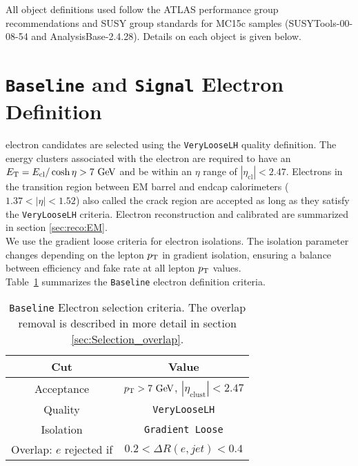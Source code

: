 \indent All object definitions used follow the ATLAS performance group recommendations and SUSY group standards for MC15c samples ({\sc SUSYTools-00-08-54} and {\sc AnalysisBase-2.4.28}).  Details on each object is given below. \\

\section{{\tt Baseline} and {\tt Signal} Electron Definition}  \label{sec:EleDef}

 electron candidates are selected using the {\tt VeryLooseLH} quality definition. The energy clusters associated with the electron are required to have an $\et = E_{\mathrm{cl}} / \cosh{\eta} > 7 \gev$ and be within an $\eta$ range of $|\eta_{\mathrm{cl}}| < 2.47$. Electrons in the transition region between EM barrel and endcap calorimeters ($1.37 < |\eta| < 1.52$) also called the crack region are accepted as long as they satisfy the {\tt VeryLooseLH} criteria. Electron reconstruction and calibrated are summarized in section \ref{sec:reco:EM}.\\

\indent We use the gradient loose criteria for electron isolations. The isolation parameter changes depending on the lepton $p_{\mathrm{T}}$ in gradient isolation, ensuring a balance between efficiency and fake rate at all lepton $p_{\mathrm{T}}$ values. \\

\indent Table~\ref{tb:electrons:baseline} summarizes the {\tt Baseline} electron definition criteria.   


\begin{table}[htp]
  \begin{center}
    \begin{tabular}{c|c} \hline \hline
      Cut & Value \\ \hline \hline
      Acceptance & $\pT > 7 \gev$, $|\eta_{\mathrm{clust}}| < 2.47$ \\ \hline
      Quality & {\tt VeryLooseLH} \\ \hline
      Isolation & {\tt Gradient Loose} \\ \hline
      Overlap: $e$ rejected if &  $0.2 < \Delta R(e,jet) < 0.4$\\ \hline%
      \hline
    \end{tabular}
  \caption{{\tt Baseline} Electron selection criteria. The overlap removal is described in more detail in section \ref{sec:Selection_overlap}.}
  \end{center}
  \label{tb:electrons:baseline}
\end{table}%

